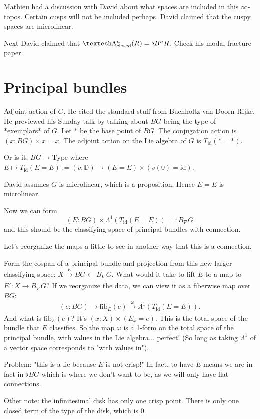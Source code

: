 \documentclass[17pt]{extarticle}
\begin{document}
Mathieu had a discussion with David about what spaces are included in this $\infty$-topos. Certain cusps will not be included perhaps. David claimed that the cuspy spaces are microlinear.

Next David claimed that $\shape\Lambda^n_\mathrm{closed}(R) = \flat B^n R$. Check his modal fracture paper.

\section{Principal bundles}

Adjoint action of $G$. He cited the standard stuff from Buchholtz-van Doorn-Rijke. He previewed his Sunday talk by talking about $BG$ being the type of *exemplars* of $G$. Let $*$ be the base point of $BG$. The conjugation action is $(x:BG)\times x=x$. The adjoint action on the Lie algebra of $G$ is $T_\mathrm{id}(*=*)$.

Or is it, $BG\to\mathrm{Type}$ where $E\mapsto T_\mathrm{id}(E=E):= (v:\mathbb{D})\to (E=E)\times (v(0)=\mathrm{id})$.

David assumes $G$ is microlinear, which is a proposition. Hence $E=E$ is microlinear. 

Now we can form $$(E:BG)\times\Lambda^1(T_\mathrm{id}(E=E))=: B_\nabla G$$
and this should be the classifying space of principal bundles with connection.

Let's reorganize the maps a little to see in another way that this is a connection.

Form the cospan of a principal bundle and projection from this new larger classifying space: $X\xrightarrow[]{E}BG\leftarrow B_\nabla G$. What would it take to lift $E$ to a map to $E':X\to B_\nabla G$? If we reorganize the data, we can view it as a fiberwise map over $BG$: $$(e:BG)\to \mathrm{fib}_E(e)\xrightarrow[]{\omega} \Lambda^1(T_\mathrm{id}(E=E)).$$ And what is $\mathrm{fib}_E(e)$? It's $(x:X)\times(E_x=e)$.  This is the total space of the bundle that $E$ classifies. So the map $\omega$ is a 1-form on the total space of the principal bundle, with values in the Lie algebra... perfect! (So long as taking $\Lambda^1$ of a vector space corresponds to "with values in").

Problem: "this is a lie because $E$ is not crisp!" In fact, to have $E$ means we are in fact in $\flat BG$ which is where we don't want to be, as we will only have flat connections.

Other note: the infinitesimal disk has only one crisp point. There is only one closed term of the type of the disk, which is 0.



\end{document}
